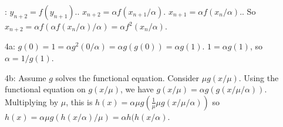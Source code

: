 \documentclass[12pt,letterpaper,noanswers]{exam}
\begin{document}
: $y_{n+2} = f(y_{n+1}).$. $x_{n+2} = \alpha f( x_{n+1}/\alpha)$.  $x_{n+1} = \alpha f( x_{n}/\alpha).$. So $x_{n+2} = \alpha f( \alpha f( x_{n}/\alpha)/\alpha) = \alpha f^2(x_n/\alpha)$.

\noindent
4a: $g(0) = 1 = \alpha g^2(0/\alpha) = \alpha g(g(0)) = \alpha g(1).$  $1 = \alpha g(1)$, so $\alpha = 1/g(1)$.

4b: Assume $g$ solves the functional equation.  Consider $\mu g(x/\mu)$.  Using the functional equation on $g(x/\mu)$, we have $g(x/\mu) = \alpha g(g(x/\mu/\alpha))$. Multiplying by $\mu$, this is $h(x) = \alpha\mu g(\frac{1}{\mu}\mu g(x/\mu/\alpha))$ so $h(x) = \alpha\mu g(h(x/\alpha)/\mu) = \alpha h(h(x/\alpha)$.
\end{document}

